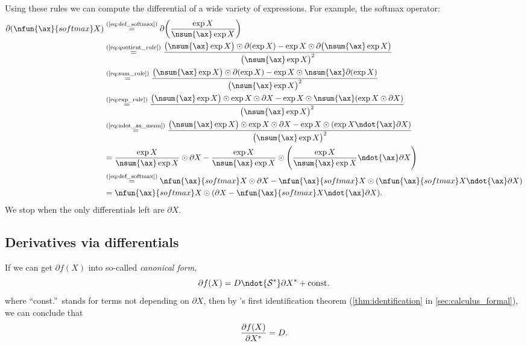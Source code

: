 Using these rules we can compute the differential of a wide variety of expressions. For example, the softmax operator:
\begin{align}
  \partial (\nfun{\ax}{softmax} X) &\eqby{eq:def_softmax} \partial \biggl(\frac{\exp X}{\nsum{\ax} \exp X}\biggr) \notag \\
  &\eqby{eq:quotient_rule} \frac{\bigl(\nsum{\ax} \exp X\bigr) \odot \partial(\exp X) - \exp X \odot \partial\bigl(\nsum{\ax} \exp X\bigr)}{\bigl(\nsum{\ax} \exp X\bigr)^2} \notag \\
  &\eqby{eq:sum_rule} \frac{\bigl( \nsum{\ax} \exp X\bigr) \odot \partial(\exp X) - \exp X \odot \nsum{\ax} \partial(\exp X)}{\bigl(\nsum{\ax} \exp X\bigr)^2} \notag \\
  &\eqby{eq:exp_rule} \frac{\bigl(\nsum{\ax} \exp X\bigr) \odot \exp X \odot \partial X - \exp X \odot \nsum{\ax} (\exp X \odot \partial X)}{\bigl(\nsum{\ax} \exp X\bigr)^2} \notag \\
  &\eqby{eq:ndot_as_nsum} \frac{\bigl(\nsum{\ax} \exp X\bigr) \odot \exp X \odot \partial X - \exp X \odot (\exp X \ndot{\ax} \partial X)}{\bigl(\nsum{\ax} \exp X\bigr)^2} \notag \\
  &= \frac{\exp X}{\nsum{\ax} \exp X}  \odot \partial X - \frac{\exp X}{\nsum{\ax} \exp X} \odot \Biggl(\frac{\exp X}{\nsum{\ax} \exp X} \ndot{\ax} \partial X\Biggr) \notag \\
  &\eqby{eq:def_softmax} \nfun{\ax}{softmax} X \odot \partial X - \nfun{\ax}{softmax} X \odot (\nfun{\ax}{softmax} X \ndot{\ax} \partial X) \notag \\
  &= \nfun{\ax}{softmax} X \odot (\partial X - \nfun{\ax}{softmax} X \ndot{\ax} \partial X). \label{eq:diff_softmax}
\end{align}
We stop when the only differentials left are $\partial X$.

\subsection{Derivatives via differentials}

If we can get $\partial f(X)$ into so-called \emph{canonical form},
\begin{equation}
  \partial f(X) = D \ndot{\mathcal{S}\inax} \partial X\inax + \text{const.}
  \label{eq:canonical}
\end{equation}
where ``const.''~stands for terms not depending on $\partial X$, then
by \citeauthor{magnus+neudecker:1985}'s first identification theorem (\cref{thm:identification} in \cref{sec:calculus_formal}),
we can conclude that
\begin{equation*}
  \frac{\partial f(X)}{\partial X^*} = D.
\end{equation*}

